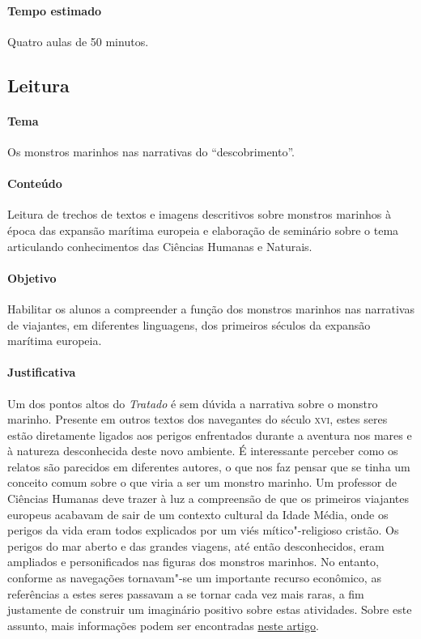 \documentclass[12pt]{extarticle}
\begin{document}
\paragraph{Tempo estimado} Quatro aulas de 50 minutos.


\subsection{Leitura}

\paragraph{Tema} Os monstros marinhos nas narrativas do ``descobrimento''.

\paragraph{Conteúdo} Leitura de trechos de textos e imagens descritivos
sobre monstros marinhos à época das expansão marítima europeia e 
elaboração de seminário sobre o tema articulando conhecimentos das 
Ciências Humanas e Naturais.  

\paragraph{Objetivo} Habilitar os alunos a compreender a função dos 
monstros marinhos nas narrativas de viajantes, em diferentes linguagens, 
dos primeiros séculos da expansão marítima europeia.

\paragraph{Justificativa} Um dos pontos altos do \emph{Tratado} é sem
dúvida a narrativa sobre o monstro marinho. Presente em outros textos 
dos navegantes do século \textsc{xvi}, estes seres estão diretamente
ligados aos perigos enfrentados durante a aventura nos mares e à natureza
desconhecida deste novo ambiente. É interessante perceber como os relatos
são parecidos em diferentes autores, o que nos faz pensar que se tinha 
um conceito comum sobre o que viria a ser um monstro marinho. 
Um professor de Ciências Humanas deve trazer à luz a compreensão de que
os primeiros viajantes europeus acabavam de sair de um contexto cultural
da Idade Média, onde os perigos da vida eram todos explicados por um
viés mítico"-religioso cristão. Os perigos do mar aberto e das grandes 
viagens, até então desconhecidos, eram ampliados e personificados nas
figuras dos monstros marinhos. No entanto, conforme as navegações 
tornavam"-se um importante recurso econômico, as referências a estes seres
passavam a se tornar cada vez mais raras, a fim justamente de construir
um imaginário positivo sobre estas atividades. 
Sobre este assunto, mais informações podem ser encontradas \href{https://www2.ufjf.br/noticias/2015/12/16/monstros-na-historia-relatos-de-viagens-expedicionarias-e-brasil-colonia/}{neste artigo}.
\end{document}
